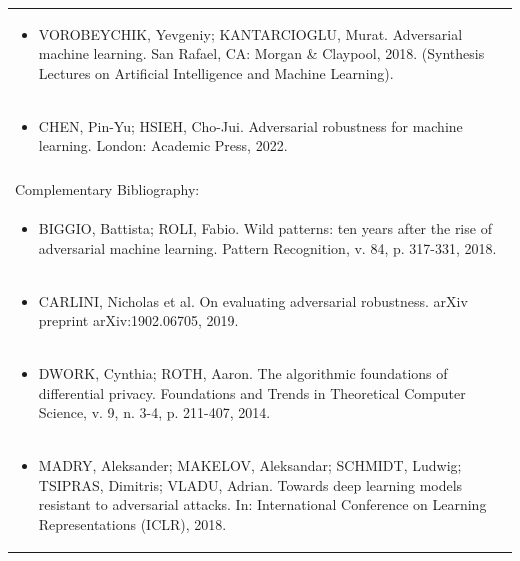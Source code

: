 \documentclass[11pt]{article}
\begin{document}
\begin{center}
\begin{longtable}{|p{4cm}|p{4cm}|p{4cm}|p{4cm}|}
\multicolumn{4}{|p{\dimexpr 16cm + 6\tabcolsep\relax}|}{\begin{itemize}\item VOROBEYCHIK, Yevgeniy; KANTARCIOGLU, Murat. Adversarial machine learning. San Rafael, CA: Morgan \& Claypool, 2018. (Synthesis Lectures on Artificial Intelligence and Machine Learning).\end{itemize}}\\
\multicolumn{4}{|p{\dimexpr 16cm + 6\tabcolsep\relax}|}{\begin{itemize}\item CHEN, Pin-Yu; HSIEH, Cho-Jui. Adversarial robustness for machine learning. London: Academic Press, 2022.\end{itemize}}\\
\multicolumn{4}{|p{16cm}|}{}\\
\hline
\multicolumn{4}{|p{16cm}|}{Complementary Bibliography:}\\*
\multicolumn{4}{|p{\dimexpr 16cm + 6\tabcolsep\relax}|}{\begin{itemize}\item BIGGIO, Battista; ROLI, Fabio. Wild patterns: ten years after the rise of adversarial machine learning. Pattern Recognition, v. 84, p. 317-331, 2018.\end{itemize}}\\
\multicolumn{4}{|p{\dimexpr 16cm + 6\tabcolsep\relax}|}{\begin{itemize}\item CARLINI, Nicholas et al. On evaluating adversarial robustness. arXiv preprint arXiv:1902.06705, 2019.\end{itemize}}\\
\multicolumn{4}{|p{\dimexpr 16cm + 6\tabcolsep\relax}|}{\begin{itemize}\item DWORK, Cynthia; ROTH, Aaron. The algorithmic foundations of differential privacy. Foundations and Trends in Theoretical Computer Science, v. 9, n. 3-4, p. 211-407, 2014.\end{itemize}}\\
\multicolumn{4}{|p{\dimexpr 16cm + 6\tabcolsep\relax}|}{\begin{itemize}\item MADRY, Aleksander; MAKELOV, Aleksandar; SCHMIDT, Ludwig; TSIPRAS, Dimitris; VLADU, Adrian. Towards deep learning models resistant to adversarial attacks. In: International Conference on Learning Representations (ICLR), 2018.\end{itemize}}\\

\end{longtable}
\end{center}
\end{document}

